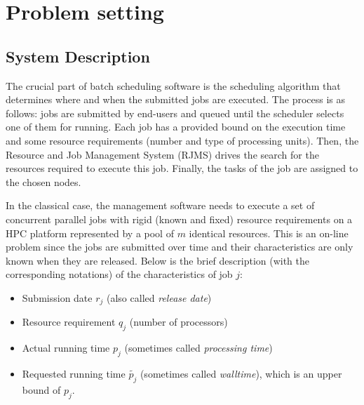 \documentclass[sigconf,anonymous]{acmart}
\begin{document}

\section{Problem setting}
\label{sec:problem_setting}


\subsection{System Description}
\label{sub:sysdesc}

The crucial part of batch scheduling software is the scheduling algorithm that
determines where and when the submitted jobs are executed. The process is as
follows: jobs are submitted by end-users and queued until the scheduler selects
one of them for running. Each job has a provided bound on the execution time
and some resource requirements (number and type of processing units). Then, the
Resource and Job Management System (RJMS) drives the search for the resources required to execute this job. Finally,
the tasks of the job are assigned to the chosen nodes.

In the classical case, the management software needs to execute a set of
concurrent parallel jobs with rigid (known and fixed) resource requirements on
a HPC platform represented by a pool of $m$ identical resources. This is an
on-line problem since the jobs are submitted over time and their
characteristics are only known when they are released.  Below is the brief
description (with the corresponding notations) of the characteristics of job
$j$:

\begin{itemize}

   \item Submission date $r_j$ (also called \textit{release date})

   \item Resource requirement $q_j$ (number of processors)

   \item Actual running time $p_j$ (sometimes called \textit{processing time})

   \item Requested running time $\widetilde{p_j}$ (sometimes called
     \textit{walltime}), which is an upper bound of $p_j$.

\end{itemize}
\end{document}
